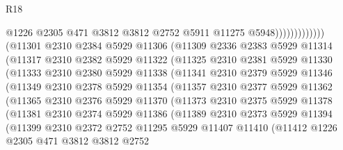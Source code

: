 \begin{lexlean}{R18}
\begin{coremodule}
                                  @1226
                                  @2305
                                  @471
                                  @3812
                                  @3812
                                  @2752
                                  @5911
                                  @11275
                                  @5948)))))))))))))
        (@11301
          @2310
          @2384
          @5929
          @11306
          (@11309
            @2336
            @2383
            @5929
            @11314
            (@11317
              @2310
              @2382
              @5929
              @11322
              (@11325
                @2310
                @2381
                @5929
                @11330
                (@11333
                  @2310
                  @2380
                  @5929
                  @11338
                  (@11341
                    @2310
                    @2379
                    @5929
                    @11346
                    (@11349
                      @2310
                      @2378
                      @5929
                      @11354
                      (@11357
                        @2310
                        @2377
                        @5929
                        @11362
                        (@11365
                          @2310
                          @2376
                          @5929
                          @11370
                          (@11373
                            @2310
                            @2375
                            @5929
                            @11378
                            (@11381
                              @2310
                              @2374
                              @5929
                              @11386
                              (@11389
                                @2310
                                @2373
                                @5929
                                @11394
                                (@11399
                                  @2310
                                  @2372
                                  @2752
                                  @11295
                                  @5929
                                  @11407
                                  @11410
                                  (@11412
                                    @1226
                                    @2305
                                    @471
                                    @3812
                                    @3812
                                    @2752

\end{coremodule}
\end{lexlean}
